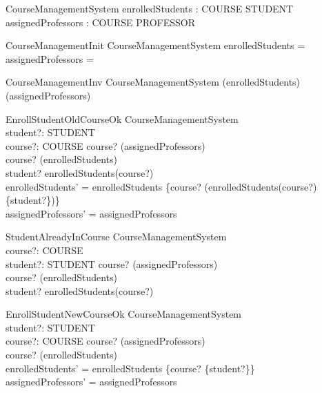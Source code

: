 \begin{zed}
\end{zed}

\begin{schema}{CourseManagementSystem}
    enrolledStudents : COURSE \pfun \power STUDENT \\
    assignedProfessors : COURSE \pfun \power PROFESSOR
\end{schema}

\begin{schema}{CourseManagementInit}
    CourseManagementSystem
    \where 
    enrolledStudents = \emptyset \\
    assignedProfessors = \emptyset
\end{schema}

\begin{schema}{CourseManagementInv}
    CourseManagementSystem
    \where
    \dom(enrolledStudents) \subseteq \dom(assignedProfessors) 
\end{schema}

\begin{schema}{EnrollStudentOldCourseOk}
    \Delta CourseManagementSystem \\
    student?: STUDENT \\
    course?: COURSE
    \where
    course? \in \dom(assignedProfessors) \\
    course? \in \dom(enrolledStudents) \\
    student? \notin enrolledStudents(course?) \\
    enrolledStudents' = enrolledStudents \oplus \{course? \mapsto (enrolledStudents(course?) \cup \{student?\})\} \\
    assignedProfessors' = assignedProfessors
\end{schema}

\begin{schema}{StudentAlreadyInCourse}
\Xi CourseManagementSystem \\
course?: COURSE \\
student?: STUDENT
\where
    course? \in \dom(assignedProfessors) \\
    course? \in \dom(enrolledStudents) \\
    student? \in enrolledStudents(course?)
\end{schema}

\begin{schema}{EnrollStudentNewCourseOk}
    \Delta CourseManagementSystem \\
    student?: STUDENT \\
    course?: COURSE
    \where
    course? \in \dom(assignedProfessors) \\
    course? \notin \dom(enrolledStudents) \\
    enrolledStudents' = enrolledStudents \cup \{course? \mapsto \{student?\}\} \\
    assignedProfessors' = assignedProfessors
\end{schema}

